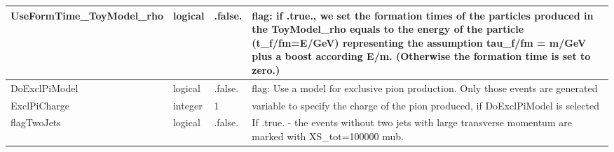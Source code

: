 \documentclass{article}
\begin{document}
\begin{longtable}{llll}
\midrule
UseFormTime\_ToyModel\_rho & \begin{minipage}[t]{2cm}logical\end{minipage} & \begin{minipage}[t]{2cm}.false.\end{minipage} & \begin{minipage}[t]{12cm}flag: if .true., we set the formation times of the particles produced in the ToyModel\_rho equals to the energy of the particle (t\_f/fm=E/GeV) representing the assumption tau\_f/fm = m/GeV plus a boost according E/m. (Otherwise the formation time is set to zero.)\end{minipage}\\*
\midrule
DoExclPiModel & \begin{minipage}[t]{2cm}logical\end{minipage} & \begin{minipage}[t]{2cm}.false.\end{minipage} & \begin{minipage}[t]{12cm}flag: Use a model for exclusive pion production. Only those events are generated\end{minipage}\\*
\midrule
ExclPiCharge & \begin{minipage}[t]{2cm}integer\end{minipage} & \begin{minipage}[t]{2cm}1\end{minipage} & \begin{minipage}[t]{12cm}variable to specify the charge of the pion produced, if DoExclPiModel is selected\end{minipage}\\*
\midrule
flagTwoJets & \begin{minipage}[t]{2cm}logical\end{minipage} & \begin{minipage}[t]{2cm}.false.\end{minipage} & \begin{minipage}[t]{12cm}If .true. - the events without two jets with large transverse momentum  are marked with XS\_tot=100000 mub.\end{minipage}\\*
\bottomrule
\end{longtable}
{ }



\end{document}
